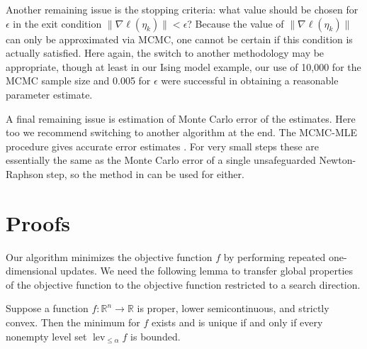 \documentclass[oneside]{myumnStatThesis}
\DeclareMathOperator{\lev}{lev}
\def\RR{{\mathbb R}}
\begin{document}
Another remaining issue is the stopping criteria: what value should be chosen for $\epsilon$ in the exit condition
$\lVert  \nabla \ell( \eta_k ) \rVert < \epsilon$?  Because the value of $\lVert  \nabla \ell( \eta_k ) \rVert$ can only 
be approximated via MCMC, one cannot be certain if this condition is actually satisfied.  Here again, the switch to 
another methodology may be appropriate, though at least in our Ising model example, our use of 10,000 for the MCMC 
sample size and 0.005 for $\epsilon$ were successful in obtaining a reasonable parameter estimate. 

 A final remaining issue is estimation of Monte Carlo error of the estimates.  Here too we recommend switching to another
algorithm at the end.  The MCMC-MLE procedure gives accurate error estimates \citep{Geyer:1994}.
For very small steps these are essentially the same as the Monte Carlo error of a single unsafeguarded Newton-Raphson step,
so the method in \citep{Geyer:1994} can be used for either.






%

%


\appendix
\chapter{Proofs} \label{Section:Proofs}
Our algorithm minimizes the objective function $f$ by performing repeated one-dimensional updates.  We need the 
following lemma to transfer global properties of the objective function to the objective function restricted to a 
search direction.

\begin{lemma} \label{Lemma:f min} 
Suppose a function $f:\RR^n \to \RR$ is proper, lower semicontinuous, and strictly convex.  Then the minimum for $f$ 
exists and is unique if and only if every nonempty level set $\lev_{\leq \alpha} f$ is bounded.
\end{lemma}
\end{document}
